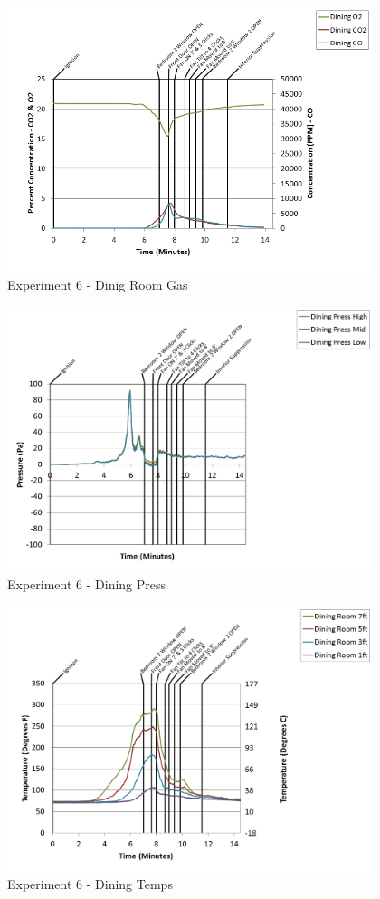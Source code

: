 \documentclass{article}
\begin{document}
\begin{appendices}
\begin{figure}[h!]
	\centering
	\includegraphics[height=3.05in]{0_Images/Results_Charts/Exp_6_Charts/DinigRoomGas.png}
	\caption{Experiment 6 - Dinig Room Gas}
\end{figure}

\clearpage

\begin{figure}[h!]
	\centering
	\includegraphics[height=3.05in]{0_Images/Results_Charts/Exp_6_Charts/DiningPress.png}
	\caption{Experiment 6 - Dining Press}
\end{figure}


\begin{figure}[h!]
	\centering
	\includegraphics[height=3.05in]{0_Images/Results_Charts/Exp_6_Charts/DiningTemps.png}
	\caption{Experiment 6 - Dining Temps}
\end{figure}


\end{appendices}
\end{document}
